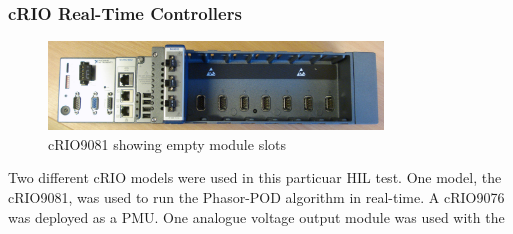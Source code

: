 \documentclass[conference]{IEEEtran}
\begin{document}

\subsubsection{cRIO Real-Time Controllers}
\begin{figure}[H]
\centering
\includegraphics[width=3.5in]{DSC05446.JPG}
\vspace{-0.5em}
\caption{cRIO9081 showing empty module slots}
\label{cRIO}
\end{figure}
Two different cRIO models were used in this particuar HIL test. One model, the cRIO9081, was used to run the Phasor-POD algorithm in real-time. A cRIO9076 was deployed as a PMU. One analogue voltage output module was used with the 
\end{document}
